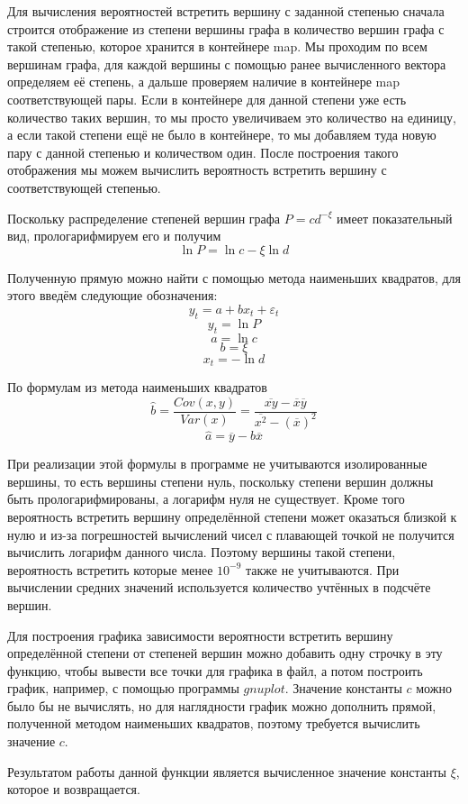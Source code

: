 \documentclass[14pt]{extreport}
\begin{document}
Для вычисления вероятностей встретить вершину с заданной степенью сначала строится отображение из степени вершины графа в количество вершин графа с такой степенью, которое хранится в контейнере map. Мы проходим по всем вершинам графа, для каждой вершины с помощью ранее вычисленного вектора определяем её степень, а дальше проверяем наличие в контейнере map соответствующей пары. Если в контейнере для данной степени уже есть количество таких вершин, то мы просто увеличиваем это количество на единицу, а если такой степени ещё не было в контейнере, то мы добавляем туда новую пару с данной степенью и количеством один. После построения такого отображения мы можем вычислить вероятность встретить вершину с соответствующей степенью.

Поскольку распределение степеней вершин графа $P = c d^{-\xi}$ имеет показательный вид, прологарифмируем его и получим
$$
\ln{P} = \ln{c} - \xi \ln{d}
$$

Полученную прямую можно найти с помощью метода наименьших квадратов, для этого введём следующие обозначения:
$$
y_t = a + b x_t + \varepsilon_t
$$
$$
y_t = \ln{P}
$$
$$
a = \ln{c}
$$
$$
b = \xi
$$
$$
x_t = -\ln{d}
$$

По формулам из метода наименьших квадратов
$$
\hat{b} = \frac{Cov(x,y)}{Var(x)} = \frac{\overline{x y}-\overline{x}\overline{y}}{\overline{x^2}-\left(\overline{x}\right)^2}
$$
$$
\hat{a} = \overline{y} - b\overline{x}
$$

При реализации этой формулы в программе не учитываются изолированные вершины, то есть вершины степени нуль, поскольку степени вершин должны быть прологарифмированы, а логарифм нуля не существует. Кроме того вероятность встретить вершину определённой степени может оказаться близкой к нулю и из-за погрешностей вычислений чисел с плавающей точкой не получится вычислить логарифм данного числа. Поэтому вершины такой степени, вероятность встретить которые менее $10^{-9}$ также не учитываются. При вычислении средних значений используется количество учтённых в подсчёте вершин.

Для построения графика зависимости вероятности встретить вершину определённой степени от степеней вершин можно добавить одну строчку в эту функцию, чтобы вывести все точки для графика в файл, а потом построить график, например, с помощью программы $gnuplot$. Значение константы $c$ можно было бы не вычислять, но для наглядности график можно дополнить прямой, полученной методом наименьших квадратов, поэтому требуется вычислить значение $c$.

Результатом работы данной функции является вычисленное значение константы $\xi$, которое и возвращается.
\end{document}
